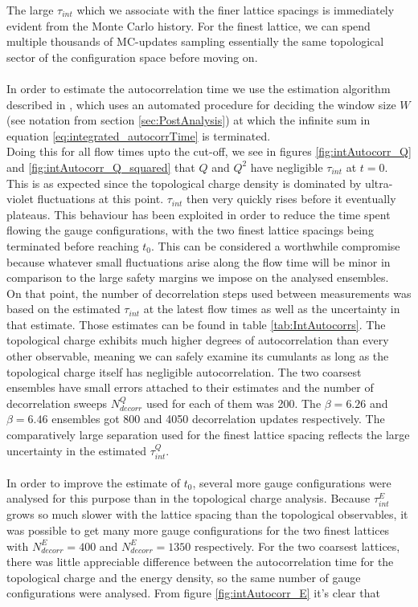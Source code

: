 \documentclass[a4paper,10pt]{book}
\begin{document}
The large $\tau_{int}$ which we associate with the finer lattice spacings is immediately evident from the Monte Carlo history. For the finest lattice, we can spend multiple thousands of MC-updates sampling essentially the same topological sector of the configuration space before moving on.\\\\In order to estimate the autocorrelation time we use the estimation algorithm described in \cite{WOLFF2004143}, which uses an automated procedure for deciding the window size $W$ (see notation from section \ref{sec:PostAnalysis}) at which the infinite sum in equation \eqref{eq:integrated_autocorrTime} is terminated. \\Doing this for all flow times upto the cut-off, we see in figures \ref{fig:intAutocorr_Q} and \ref{fig:intAutocorr_Q_squared} that $Q$ and $Q^2$ have negligible $\tau_{int}$ at $t = 0$. This is as expected since the topological charge density is dominated by ultra-violet fluctuations  at this point. $\tau_{int}$ then very quickly rises before it eventually plateaus. This behaviour has been exploited in order to reduce the time spent flowing the gauge configurations, with the two finest lattice spacings being terminated before reaching $t_0$. This can be considered a worthwhile compromise because whatever small fluctuations arise along the flow time will be minor in comparison to the large safety margins we impose on the analysed ensembles.\\On that point, the number of decorrelation steps used between measurements was based on the estimated $\tau_{int}$ at the latest flow times as well as the uncertainty in that estimate. Those estimates can be found in table \ref{tab:IntAutocorrs}. The topological charge exhibits much higher degrees of autocorrelation than every other observable, meaning we can safely examine its cumulants as long as the topological charge itself has negligible autocorrelation. The two coarsest ensembles have small errors attached to their estimates and the number of decorrelation sweeps $N_{decorr}^Q$ used for each of them was 200. The $\beta=6.26$ and $\beta=6.46$ ensembles got 800 and 4050 decorrelation updates respectively. The comparatively large separation used for the finest lattice spacing reflects the large uncertainty in the estimated $\tau_{int}^Q$.\\\\In order to improve the estimate of $t_0$, several more gauge configurations were analysed for this purpose than in the topological charge analysis. Because $\tau_{int}^E$ grows so much slower with the lattice spacing than the topological observables, it was possible to get many more gauge configurations for the two finest lattices with $N_{decorr}^E=400$ and $N_{decorr}^E=1350$ respectively. For the two coarsest lattices, there was little appreciable difference between the autocorrelation time for the topological charge and the energy density, so the same number of gauge configurations were analysed. From figure \ref{fig:intAutocorr_E} it's clear that 
\end{document}
